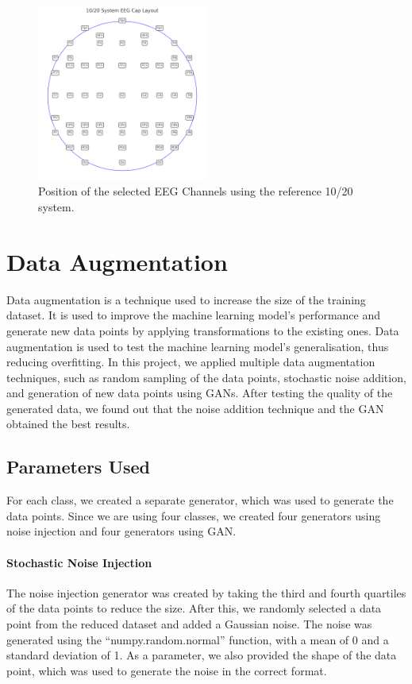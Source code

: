\begin{figure}[!htbp]
    \centering
    \includegraphics[width=0.5\textwidth]{Figures/Methodology/thesis_eeg_cap}
    \caption{Position of the selected EEG Channels using the reference 10/20 system.}
    \label{fig:eeg_channels}
\end{figure}

\section{Data Augmentation}
Data augmentation is a technique used to increase the size of the training dataset.
It is used to improve the machine learning model's performance and generate new data points by applying transformations to the existing ones.
Data augmentation is used to test the machine learning model's generalisation, thus reducing overfitting.
In this project, we applied multiple data augmentation techniques, such as random sampling of the data points, stochastic noise addition, and generation of new data points using GANs.
After testing the quality of the generated data, we found out that the noise addition technique and the GAN obtained the best results.

\subsection*{Parameters Used}
For each class, we created a separate generator, which was used to generate the data points.
Since we are using four classes, we created four generators using noise injection and four generators using GAN.
\paragraph*{Stochastic Noise Injection}
The noise injection generator was created by taking the third and fourth quartiles of the data points to reduce the size.
After this, we randomly selected a data point from the reduced dataset and added a Gaussian noise.
The noise was generated using the ``numpy.random.normal'' function, with a mean of 0 and a standard deviation of 1.
As a parameter, we also provided the shape of the data point, which was used to generate the noise in the correct format.
